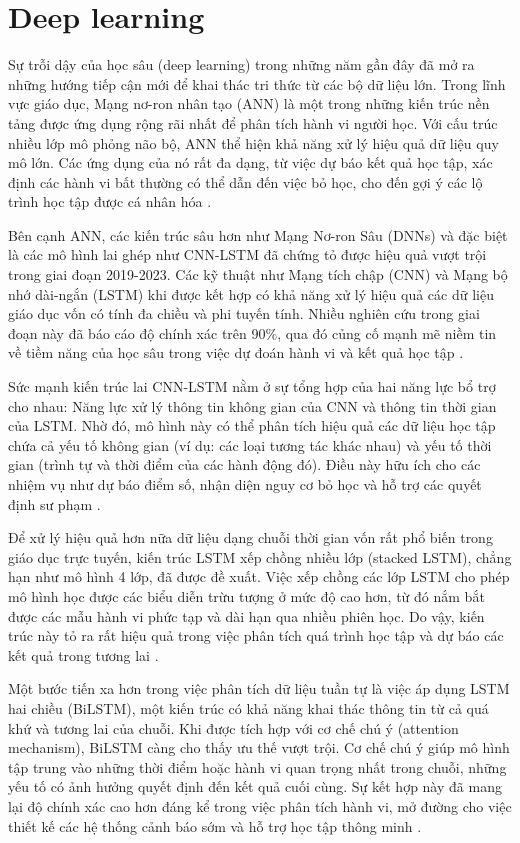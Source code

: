 \section{Deep learning}

Sự trỗi dậy của học sâu (deep learning) trong những năm gần đây đã mở ra những hướng tiếp cận mới để khai thác tri thức từ các bộ dữ liệu lớn. Trong lĩnh vực giáo dục, Mạng nơ-ron nhân tạo (ANN) là một trong những kiến trúc nền tảng được ứng dụng rộng rãi nhất để phân tích hành vi người học. Với cấu trúc nhiều lớp mô phỏng não bộ, ANN thể hiện khả năng xử lý hiệu quả dữ liệu quy mô lớn. Các ứng dụng của nó rất đa dạng, từ việc dự báo kết quả học tập, xác định các hành vi bất thường có thể dẫn đến việc bỏ học, cho đến gợi ý các lộ trình học tập được cá nhân hóa \cite{waheed2020predicting, coelho2017deep}.

Bên cạnh ANN, các kiến trúc sâu hơn như Mạng Nơ-ron Sâu (DNNs) và đặc biệt là các mô hình lai ghép như CNN-LSTM đã chứng tỏ được hiệu quả vượt trội trong giai đoạn 2019-2023. Các kỹ thuật như Mạng tích chập (CNN) và Mạng bộ nhớ dài-ngắn (LSTM) khi được kết hợp có khả năng xử lý hiệu quả các dữ liệu giáo dục vốn có tính đa chiều và phi tuyến tính. Nhiều nghiên cứu trong giai đoạn này đã báo cáo độ chính xác trên 90\%, qua đó củng cố mạnh mẽ niềm tin về tiềm năng của học sâu trong việc dự đoán hành vi và kết quả học tập \cite{albreiki2021systematic}.

Sức mạnh kiến trúc lai CNN-LSTM nằm ở sự tổng hợp của hai năng lực bổ trợ cho nhau: Năng lực xử lý thông tin không gian của CNN và thông tin thời gian của LSTM. Nhờ đó, mô hình này có thể phân tích hiệu quả các dữ liệu học tập chứa cả yếu tố không gian (ví dụ: các loại tương tác khác nhau) và yếu tố thời gian (trình tự và thời điểm của các hành động đó). Điều này hữu ích cho các nhiệm vụ như dự báo điểm số, nhận diện nguy cơ bỏ học và hỗ trợ các quyết định sư phạm \cite{aljaloud2022deep}.

Để xử lý hiệu quả hơn nữa dữ liệu dạng chuỗi thời gian vốn rất phổ biến trong giáo dục trực tuyến, kiến trúc LSTM xếp chồng nhiều lớp (stacked LSTM), chẳng hạn như mô hình 4 lớp, đã được đề xuất. Việc xếp chồng các lớp LSTM cho phép mô hình học được các biểu diễn trừu tượng ở mức độ cao hơn, từ đó nắm bắt được các mẫu hành vi phức tạp và dài hạn qua nhiều phiên học. Do vậy, kiến trúc này tỏ ra rất hiệu quả trong việc phân tích quá trình học tập và dự báo các kết quả trong tương lai \cite{kukkar2023prediction, ren2023prediction}.

Một bước tiến xa hơn trong việc phân tích dữ liệu tuần tự là việc áp dụng LSTM hai chiều (BiLSTM), một kiến trúc có khả năng khai thác thông tin từ cả quá khứ và tương lai của chuỗi. Khi được tích hợp với cơ chế chú ý (attention mechanism), BiLSTM càng cho thấy ưu thế vượt trội. Cơ chế chú ý giúp mô hình tập trung vào những thời điểm hoặc hành vi quan trọng nhất trong chuỗi, những yếu tố có ảnh hưởng quyết định đến kết quả cuối cùng. Sự kết hợp này đã mang lại độ chính xác cao hơn đáng kể trong việc phân tích hành vi, mở đường cho việc thiết kế các hệ thống cảnh báo sớm và hỗ trợ học tập thông minh \cite{yousafzai2021student}.

